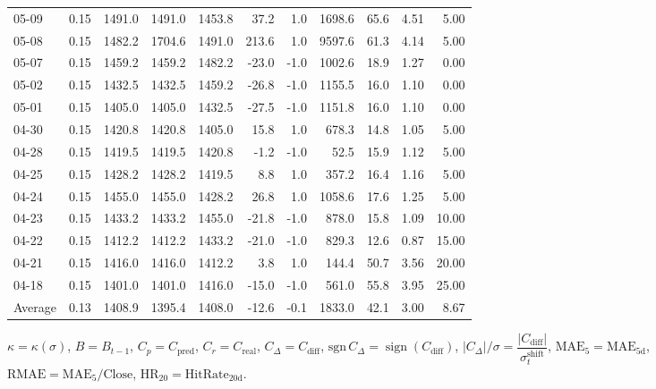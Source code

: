 \begin{threeparttable}
{\begin{tabular}{lrrrrrrrrrr}
05-09 & 0.15 & 1491.0 & 1491.0 & 1453.8 & 37.2 & 1.0 & 1698.6 & 65.6 & 4.51 & 5.00 \\
05-08 & 0.15 & 1482.2 & 1704.6 & 1491.0 & 213.6 & 1.0 & 9597.6 & 61.3 & 4.14 & 5.00 \\
05-07 & 0.15 & 1459.2 & 1459.2 & 1482.2 & -23.0 & -1.0 & 1002.6 & 18.9 & 1.27 & 0.00 \\
05-02 & 0.15 & 1432.5 & 1432.5 & 1459.2 & -26.8 & -1.0 & 1155.5 & 16.0 & 1.10 & 0.00 \\
05-01 & 0.15 & 1405.0 & 1405.0 & 1432.5 & -27.5 & -1.0 & 1151.8 & 16.0 & 1.10 & 0.00 \\
04-30 & 0.15 & 1420.8 & 1420.8 & 1405.0 & 15.8 & 1.0 & 678.3 & 14.8 & 1.05 & 5.00 \\
04-28 & 0.15 & 1419.5 & 1419.5 & 1420.8 & -1.2 & -1.0 & 52.5 & 15.9 & 1.12 & 5.00 \\
04-25 & 0.15 & 1428.2 & 1428.2 & 1419.5 & 8.8 & 1.0 & 357.2 & 16.4 & 1.16 & 5.00 \\
04-24 & 0.15 & 1455.0 & 1455.0 & 1428.2 & 26.8 & 1.0 & 1058.6 & 17.6 & 1.25 & 5.00 \\
04-23 & 0.15 & 1433.2 & 1433.2 & 1455.0 & -21.8 & -1.0 & 878.0 & 15.8 & 1.09 & 10.00 \\
04-22 & 0.15 & 1412.2 & 1412.2 & 1433.2 & -21.0 & -1.0 & 829.3 & 12.6 & 0.87 & 15.00 \\
04-21 & 0.15 & 1416.0 & 1416.0 & 1412.2 & 3.8 & 1.0 & 144.4 & 50.7 & 3.56 & 20.00 \\
04-18 & 0.15 & 1401.0 & 1401.0 & 1416.0 & -15.0 & -1.0 & 561.0 & 55.8 & 3.95 & 25.00 \\
Average & 0.13 & 1408.9 & 1395.4 & 1408.0 & -12.6 & -0.1 & 1833.0 & 42.1 & 3.00 & 8.67 \\
\bottomrule
\end{tabular}
}%
\begin{tablenotes}\footnotesize
\item $\kappa=\kappa(\sigma)$, $B=B_{t-1}$, $C_p=C_{\text{pred}}$, $C_r=C_{\text{real}}$, $C_\Delta=C_{\text{diff}}$, $\mathrm{sgn}\,C_\Delta=\operatorname{sign}(C_{\text{diff}})$, $|C_\Delta|/\sigma=\dfrac{|C_{\text{diff}}|}{\sigma_t^{\text{shift}}}$, $\mathrm{MAE}_5=\mathrm{MAE}_{5\text{d}}$, $\mathrm{RMAE}= \mathrm{MAE}_5 / \text{Close}$, $\mathrm{HR}_{20}=\mathrm{HitRate}_{20\text{d}}$.
\end{tablenotes}
\end{threeparttable}
\endgroup
